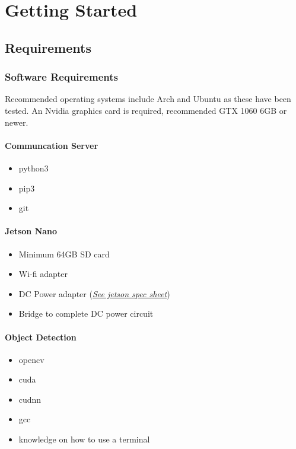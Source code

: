 \chapter{Getting Started}

\section{Requirements}
\subsection{Software Requirements}

Recommended operating systems include Arch and Ubuntu as these have been tested.
\newline
An Nvidia graphics card is required, recommended GTX 1060 6GB or newer.

\subsubsection{Communcation Server}
\begin{itemize}
    \item python3
    \item pip3
    \item git
\end{itemize}

\subsubsection{Jetson Nano}
\begin{itemize}
    \item Minimum 64GB SD card
    \item Wi-fi adapter
    \item DC Power adapter (\href{https://www.docdroid.net/yGXIxZu/data-sheet-nvidia-jetson-tx2-system-on-module.pdf}{\textit{See jetson spec sheet}}) \cite{NvidiaSpecs}
    \item Bridge to complete DC power circuit
\end{itemize}

\subsubsection{Object Detection \cite{darknet}}
\begin{itemize}
    \item opencv
    \item cuda
    \item cudnn
    \item gcc
    \item knowledge on how to use a terminal
\end{itemize}

